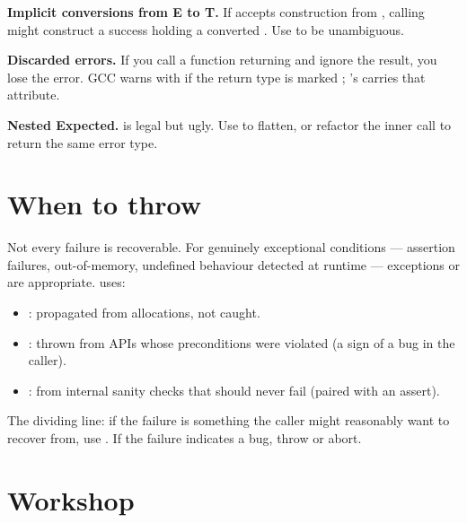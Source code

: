 \begin{warning}
\textbf{Implicit conversions from E to T.} If  accepts
construction from , calling
 might construct a success
holding a converted . Use  to be
unambiguous.
\end{warning}

\begin{warning}
\textbf{Discarded errors.} If you call a function returning
 and ignore the result, you lose the error. GCC
warns with  if the return type is marked
\code{[[nodiscard]]}; \maya{}'s  carries that
attribute.
\end{warning}

\begin{warning}
\textbf{Nested Expected.}  is
legal but ugly. Use  to flatten, or refactor the
inner call to return the same error type.
\end{warning}

\section{When to throw}

Not every failure is recoverable. For genuinely exceptional
conditions --- assertion failures, out-of-memory, undefined
behaviour detected at runtime --- exceptions or 
are appropriate. \maya{} uses:

\begin{itemize}[leftmargin=*]
  \item {}: propagated from allocations, not
    caught.
  \item {}: thrown from APIs whose
    preconditions were violated (a sign of a bug in the caller).
  \item {}: from internal sanity checks that should
    never fail (paired with an assert).
\end{itemize}

The dividing line: if the failure is something the caller might
reasonably want to recover from, use . If the
failure indicates a bug, throw or abort.

\section*{Workshop}

